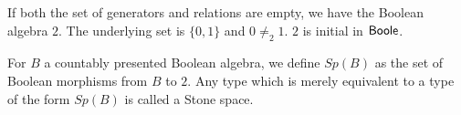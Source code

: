 \begin{example}
  If both the set of generators and relations are empty, we have the Boolean algebra $2$.
  The underlying set is $\{0,1\}$ and $0\neq_2 1$.
  $2$ is initial in $\mathsf{Boole}$. 
\end{example}
%
\begin{definition}
  For $B$ a countably presented Boolean algebra, 
  we define $Sp(B)$ as the set of Boolean morphisms from $B$ to $2$.
  Any type which is merely equivalent to a type of the form $Sp(B)$ is called a Stone space.
\end{definition}

